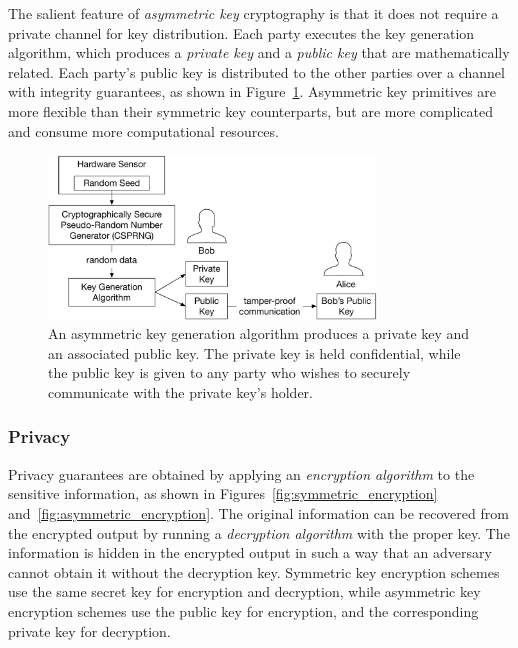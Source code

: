 The salient feature of \textit{asymmetric key} cryptography is that it does not
require a private channel for key distribution. Each party executes the key
generation algorithm, which produces a \textit{private key} and a
\textit{public key} that are mathematically related. Each party's public key
is distributed to the other parties over a channel with integrity guarantees,
as shown in Figure~\ref{fig:asymmetric_key_generation}.
Asymmetric key primitives are more flexible than their symmetric key
counterparts, but are more complicated and consume more computational
resources.

\begin{figure}[hbt]
  \centering
  \includegraphics[width=87mm]{figures/asymmetric_key_generation.pdf}
  \caption{
    An asymmetric key generation algorithm produces a private key and an
    associated public key. The private key is held confidential, while the
    public key is given to any party who wishes to securely communicate with
    the private key's holder.
  }
  \label{fig:asymmetric_key_generation}
\end{figure}


\subsubsection{Privacy}

Privacy guarantees are obtained by applying an \textit{encryption algorithm} to
the sensitive information, as shown in Figures~\ref{fig:symmetric_encryption}
and~\ref{fig:asymmetric_encryption}. The original information can be recovered
from the encrypted output by running a \textit{decryption algorithm} with the
proper key. The information is hidden in the encrypted output in such a way
that an adversary cannot obtain it without the decryption key. Symmetric key
encryption schemes use the same secret key for encryption and decryption, while
asymmetric key encryption schemes use the public key for encryption, and the
corresponding private key for decryption.

